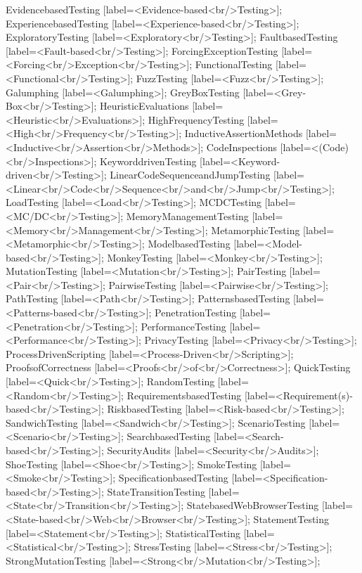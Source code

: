 \documentclass{article}
\begin{document}
{EvidencebasedTesting [label=<Evidence-based<br/>Testing>];
ExperiencebasedTesting [label=<Experience-based<br/>Testing>];
ExploratoryTesting [label=<Exploratory<br/>Testing>];
FaultbasedTesting [label=<Fault-based<br/>Testing>];
ForcingExceptionTesting [label=<Forcing<br/>Exception<br/>Testing>];
FunctionalTesting [label=<Functional<br/>Testing>];
FuzzTesting [label=<Fuzz<br/>Testing>];
Galumphing [label=<Galumphing>];
GreyBoxTesting [label=<Grey-Box<br/>Testing>];
HeuristicEvaluations [label=<Heuristic<br/>Evaluations>];
HighFrequencyTesting [label=<High<br/>Frequency<br/>Testing>];
InductiveAssertionMethods [label=<Inductive<br/>Assertion<br/>Methods>];
CodeInspections [label=<(Code)<br/>Inspections>];
KeyworddrivenTesting [label=<Keyword-driven<br/>Testing>];
LinearCodeSequenceandJumpTesting [label=<Linear<br/>Code<br/>Sequence<br/>and<br/>Jump<br/>Testing>];
LoadTesting [label=<Load<br/>Testing>];
MCDCTesting [label=<MC/DC<br/>Testing>];
MemoryManagementTesting [label=<Memory<br/>Management<br/>Testing>];
MetamorphicTesting [label=<Metamorphic<br/>Testing>];
ModelbasedTesting [label=<Model-based<br/>Testing>];
MonkeyTesting [label=<Monkey<br/>Testing>];
MutationTesting [label=<Mutation<br/>Testing>];
PairTesting [label=<Pair<br/>Testing>];
PairwiseTesting [label=<Pairwise<br/>Testing>];
PathTesting [label=<Path<br/>Testing>];
PatternsbasedTesting [label=<Patterns-based<br/>Testing>];
PenetrationTesting [label=<Penetration<br/>Testing>];
PerformanceTesting [label=<Performance<br/>Testing>];
PrivacyTesting [label=<Privacy<br/>Testing>];
ProcessDrivenScripting [label=<Process-Driven<br/>Scripting>];
ProofsofCorrectness [label=<Proofs<br/>of<br/>Correctness>];
QuickTesting [label=<Quick<br/>Testing>];
RandomTesting [label=<Random<br/>Testing>];
RequirementsbasedTesting [label=<Requirement(s)-based<br/>Testing>];
RiskbasedTesting [label=<Risk-based<br/>Testing>];
SandwichTesting [label=<Sandwich<br/>Testing>];
ScenarioTesting [label=<Scenario<br/>Testing>];
SearchbasedTesting [label=<Search-based<br/>Testing>];
SecurityAudits [label=<Security<br/>Audits>];
ShoeTesting [label=<Shoe<br/>Testing>];
SmokeTesting [label=<Smoke<br/>Testing>];
SpecificationbasedTesting [label=<Specification-based<br/>Testing>];
StateTransitionTesting [label=<State<br/>Transition<br/>Testing>];
StatebasedWebBrowserTesting [label=<State-based<br/>Web<br/>Browser<br/>Testing>];
StatementTesting [label=<Statement<br/>Testing>];
StatisticalTesting [label=<Statistical<br/>Testing>];
StressTesting [label=<Stress<br/>Testing>];
StrongMutationTesting [label=<Strong<br/>Mutation<br/>Testing>];
}
\end{document}
